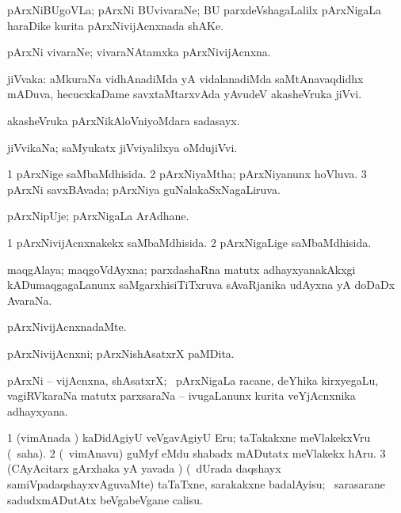 \bentry
{} 
\gl{\nA} 
\bmng
pArxNiBUgoVLa; pArxNi BUvivaraNe; BU parxdeVshagaLalilx pArxNigaLa haraDike kurita pArxNivijAcnxnada shAKe.
\emng
\eentry

\bentry
{} 
\gl{\nA} 
\bmng
pArxNi vivaraNe; vivaraNAtamxka pArxNivijAcnxna. 
\emng
\eentry

\bentry
{} 
\gl{\nA} 
\bmng
jiVvaka: 
\banum
{} aMkuraNa vidhAnadiMda yA vidalanadiMda saMtAnavaqdidhx mADuva, hecucxkaDame savxtaMtarxvAda yAvudeV akasheVruka jiVvi.  

 akasheVruka pArxNikAloVniyoMdara sadasayx.  

 jiVvikaNa; saMyukatx jiVviyalilxya oMdujiVvi. 
\eanum
\emng
\eentry

\bentry
{} 
\gl{\gu} 
\bmng
\bnum
\num{1} pArxNige saMbaMdhisida. 
\num{2} pArxNiyaMtha; pArxNiyanunx hoVluva. 
\num{3} pArxNi savxBAvada; pArxNiya guNalakaSxNagaLiruva.
\enum
\emng 
\eentry

\bentry
{} 
\gl{\nA} 
\bmng
pArxNipUje; pArxNigaLa ArAdhane.
\emng 
\eentry

\bentry
{} 
\gl{\gu} 
\bmng
\bnum
\num{1} pArxNivijAcnxnakekx saMbaMdhisida. 
\num{2} pArxNigaLige saMbaMdhisida.
\enum
\emng
\eentry

\bentry                                             
{}  
\gl{\nA}
\bmng
maqgAlaya;  maqgoVdAyxna;   parxdashaRna matutx adhayxyanakAkxgi kADumaqgagaLanunx saMgarxhisiTiTxruva sAvaRjanika udAyxna yA doDaDx AvaraNa.
\emng
\eentry

\bentry
{} 
\gl{\kirxvi} 
\bmng
pArxNivijAcnxnadaMte.
\emng
\eentry

\bentry
{} 
\gl{\nA} 
\bmng
pArxNivijAcnxni; pArxNishAsatxrX paMDita.
\emng
\eentry

\bentry
{} 
\gl{\nA} 
\bmng
pArxNi -- vijAcnxna, shAsatxrX; \kanmu\ pArxNigaLa racane, deYhika kirxyegaLu, vagiRVkaraNa matutx parxsaraNa -- ivugaLanunx kurita veYjAcnxnika adhayxyana.
\emng
\eentry

\bentry
{} 
\gl{\akirx} 
\bmng
\bnum
\num{1} (vimAnada \vi) kaDidAgiyU veVgavAgiyU Eru; taTakakxne meVlakekxVru (\sakirx\ saha). 
\num{2} (\kanmu\  vimAnavu) guMyf eMdu shabadx mADutatx meVlakekx hAru. 
\num{3} (CAyAcitarx gArxhaka yA yavada \vi) (\kanmu\ dUrada daqshayx samiVpadaqshayxvAguvaMte) taTaTxne, sarakakxne badalAyisu; \kanmu\ sarasarane sadudxmADutAtx beVgabeVgane calisu.
\enum
\emng
\eentry

